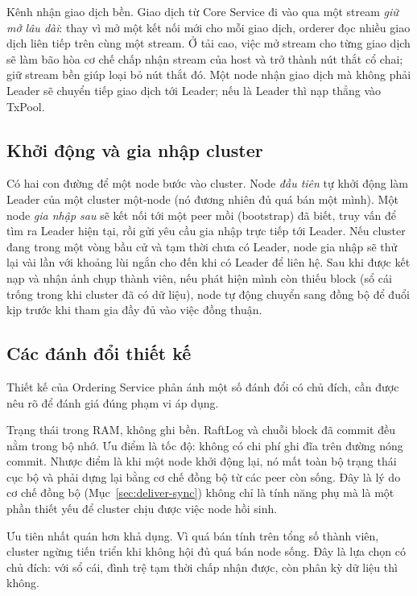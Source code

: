 Kênh nhận giao dịch bền. Giao dịch từ Core Service đi vào qua một stream
\textit{giữ mở lâu dài}: thay vì mở một kết nối mới cho mỗi giao dịch, orderer đọc
nhiều giao dịch liên tiếp trên cùng một stream. Ở tải cao, việc mở stream cho từng
giao dịch sẽ làm bão hòa cơ chế chấp nhận stream của host và trở thành nút thắt cổ
chai; giữ stream bền giúp loại bỏ nút thắt đó. Một node nhận giao dịch mà không
phải Leader sẽ chuyển tiếp giao dịch tới Leader; nếu là Leader thì nạp thẳng vào
TxPool.

\subsection{Khởi động và gia nhập cluster}
\label{sec:ordering-bootstrap}

Có hai con đường để một node bước vào cluster. Node \textit{đầu tiên} tự khởi động
làm Leader của một cluster một-node (nó đương nhiên đủ quá bán một mình). Một node
\textit{gia nhập sau} sẽ kết nối tới một peer mồi (bootstrap) đã biết, truy vấn để
tìm ra Leader hiện tại, rồi gửi yêu cầu gia nhập trực tiếp tới Leader. Nếu cluster
đang trong một vòng bầu cử và tạm thời chưa có Leader, node gia nhập sẽ thử lại vài
lần với khoảng lùi ngắn cho đến khi có Leader để liên hệ. Sau khi được kết nạp và
nhận ảnh chụp thành viên, nếu phát hiện mình còn thiếu block (sổ cái trống trong
khi cluster đã có dữ liệu), node tự động chuyển sang đồng bộ để đuổi kịp trước khi
tham gia đầy đủ vào việc đồng thuận.

\subsection{Các đánh đổi thiết kế}
\label{sec:ordering-tradeoffs}

Thiết kế của Ordering Service phản ánh một số đánh đổi có chủ đích, cần được nêu rõ
để đánh giá đúng phạm vi áp dụng.

Trạng thái trong RAM, không ghi bền. RaftLog và chuỗi block đã commit đều
nằm trong bộ nhớ. Ưu điểm là tốc độ: không có chi phí ghi đĩa trên đường nóng
commit. Nhược điểm là khi một node khởi động lại, nó mất toàn bộ trạng thái cục bộ
và phải dựng lại bằng cơ chế đồng bộ từ các peer còn sống. Đây là lý do cơ chế
đồng bộ (Mục~\ref{sec:deliver-sync}) không chỉ là tính năng phụ mà là một phần
thiết yếu để cluster chịu được việc node hồi sinh.

Ưu tiên nhất quán hơn khả dụng. Vì quá bán tính trên tổng số thành viên,
cluster ngừng tiến triển khi không hội đủ quá bán node sống. Đây là lựa chọn có
chủ đích: với sổ cái, đình trệ tạm thời chấp nhận được, còn phân kỳ dữ liệu thì
không.

